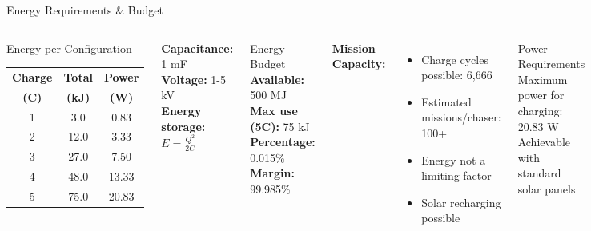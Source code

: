 \documentclass[aspectratio=169]{beamer}
\begin{document}
\begin{frame}{Energy Requirements \& Budget}
\begin{columns}[t]
\begin{block}{Energy per Configuration}
\small
\begin{tabular}{ccc}
\toprule
\textbf{Charge} & \textbf{Total} & \textbf{Power} \\
\textbf{(C)} & \textbf{(kJ)} & \textbf{(W)} \\
\midrule
1 & 3.0 & 0.83 \\
2 & 12.0 & 3.33 \\
3 & 27.0 & 7.50 \\
4 & 48.0 & 13.33 \\
5 & 75.0 & 20.83 \\
\bottomrule
\end{tabular}
\end{block}

\textbf{Capacitance:} 1 mF\\
\textbf{Voltage:} 1-5 kV\\
\textbf{Energy storage:} $E = \frac{Q^2}{2C}$

\begin{block}{Energy Budget}
\textbf{Available:} 500 MJ\\
\textbf{Max use (5C):} 75 kJ\\
\textbf{Percentage:} 0.015\%\\
\textbf{Margin:} 99.985\%
\end{block}

\textbf{Mission Capacity:}
\begin{itemize}
    \item Charge cycles possible: 6,666
    \item Estimated missions/chaser: 100+
    \item Energy not a limiting factor
    \item Solar recharging possible
\end{itemize}

\begin{block}{Power Requirements}
Maximum power for charging: 20.83 W\\
Achievable with standard solar panels
\end{block}
\end{columns}
\end{frame}
\end{document}
